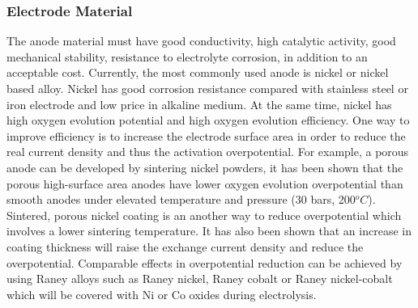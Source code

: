 


\subsubsection{Electrode Material} 
The anode material must have good conductivity, high catalytic activity, good mechanical stability, resistance to electrolyte corrosion, in addition to an acceptable cost. Currently, the most commonly used anode is nickel or nickel based alloy. Nickel has good corrosion resistance compared with stainless steel or iron electrode and low price in alkaline medium. At the same time, nickel has high oxygen evolution potential and high oxygen evolution efficiency. One way to improve efficiency is to increase the electrode surface area in order to reduce the real current density and thus the activation overpotential. For example, a porous anode can be developed by sintering nickel powders, it has been shown that the porous high-surface area anodes have lower oxygen evolution overpotential than smooth anodes under elevated temperature and pressure (30 bars, 200$^oC$). Sintered, porous nickel coating is an another way to reduce overpotential which involves a lower sintering temperature. It has also been shown that an increase in coating thickness will raise the exchange current density and reduce the overpotential. Comparable effects in overpotential reduction can be achieved by using Raney alloys such as Raney nickel, Raney cobalt or Raney nickel-cobalt which will be covered with Ni or Co oxides during electrolysis.\cite{anode} \cite{anode2}


